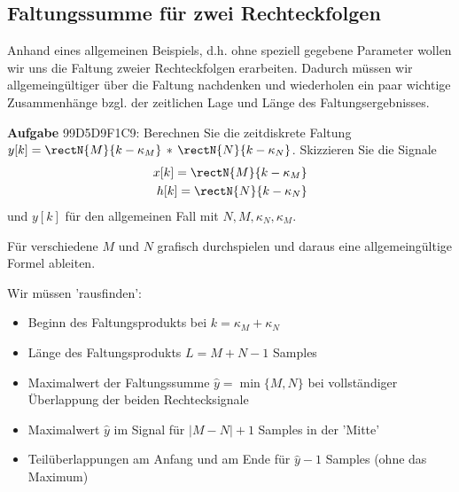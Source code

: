 \subsection{Faltungssumme für zwei Rechteckfolgen}
\label{sec:99D5D9F1C9}
\begin{Ziel}
Anhand eines allgemeinen Beispiels, d.h. ohne speziell gegebene Parameter
wollen wir uns die Faltung zweier Rechteckfolgen erarbeiten.
%
Dadurch müssen wir allgemeingültiger über die Faltung nachdenken
und wiederholen ein paar wichtige Zusammenhänge bzgl. der zeitlichen Lage und
Länge des Faltungsergebnisses.
\end{Ziel}
\textbf{Aufgabe} {\tiny 99D5D9F1C9}: Berechnen Sie die zeitdiskrete Faltung
$y[k] = \rectN{M}{k-\kappa_M} \, \ast \,\rectN{N}{k-\kappa_N}$.
Skizzieren Sie die Signale
\begin{align}
x[k]=\rectN{M}{k-\kappa_M}\\
h[k] = \rectN{N}{k-\kappa_N}
\end{align}
und $y[k]$ für den allgemeinen Fall mit
$N,M, \kappa_N, \kappa_M$.
%
\begin{Ansatz}
Für verschiedene $M$ und $N$ grafisch durchspielen und
daraus eine allgemeingültige Formel ableiten.
\end{Ansatz}
%
\begin{ExCalc}
Wir müssen 'rausfinden':
\begin{itemize}
\item Beginn des Faltungsprodukts bei $k=\kappa_M+\kappa_N$
\item Länge des Faltungsprodukts $L=M+N-1$ Samples
\item Maximalwert der Faltungssumme $\hat{y} = \min\{M,N\}$ bei vollständiger Überlappung der beiden Rechtecksignale
\item Maximalwert $\hat{y}$ im Signal für $|M-N|+1$ Samples in der 'Mitte'
\item Teilüberlappungen am Anfang und am Ende für $\hat{y}-1$ Samples (ohne das Maximum)
\end{itemize}
\end{ExCalc}
